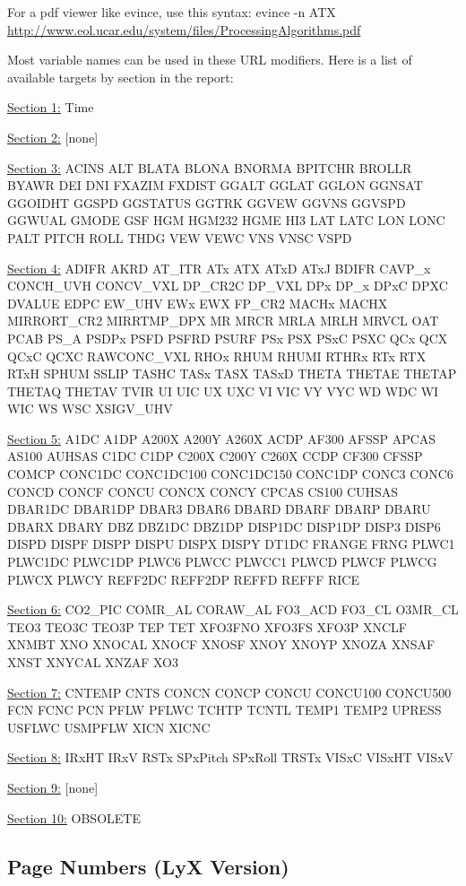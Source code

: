 \documentclass[
  english,
]{book}
\begin{document}
For a pdf viewer like evince, use this syntax: evince -n ATX
\url{http://www.eol.ucar.edu/system/files/ProcessingAlgorithms.pdf}

Most variable names can be used in these URL modifiers. Here is a list
of available targets by section in the report:

\underline{Section 1:} Time

\underline{Section 2:} {{[}none{]}}

\underline{Section 3:} ACINS ALT BLATA BLONA BNORMA BPITCHR BROLLR BYAWR
DEI DNI FXAZIM FXDIST GGALT GGLAT GGLON GGNSAT GGOIDHT GGSPD GGSTATUS
GGTRK GGVEW GGVNS GGVSPD GGWUAL GMODE GSF HGM HGM232 HGME HI3 LAT LATC
LON LONC PALT PITCH ROLL THDG VEW VEWC VNS VNSC VSPD

\underline{Section 4:} ADIFR AKRD AT\_ITR ATx ATX ATxD ATxJ BDIFR
CAVP\_x CONCH\_UVH CONCV\_VXL DP\_CR2C DP\_VXL DPx DP\_x DPxC DPXC
DVALUE EDPC EW\_UHV EWx EWX FP\_CR2 MACHx MACHX MIRRORT\_CR2
MIRRTMP\_DPX MR MRCR MRLA MRLH MRVCL OAT PCAB PS\_A PSDPx PSFD PSFRD
PSURF PSx PSX PSxC PSXC QCx QCX QCxC QCXC RAWCONC\_VXL RHOx RHUM RHUMI
RTHRx RTx RTX RTxH SPHUM SSLIP TASHC TASx TASX TASxD THETA THETAE THETAP
THETAQ THETAV TVIR UI UIC UX UXC VI VIC VY VYC WD WDC WI WIC WS WSC
XSIGV\_UHV

\underline{Section 5:} A1DC A1DP A200X A200Y A260X ACDP AF300 AFSSP
APCAS AS100 AUHSAS C1DC C1DP C200X C200Y C260X CCDP CF300 CFSSP COMCP
CONC1DC CONC1DC100 CONC1DC150 CONC1DP CONC3 CONC6 CONCD CONCF CONCU
CONCX CONCY CPCAS CS100 CUHSAS DBAR1DC DBAR1DP DBAR3 DBAR6 DBARD DBARF
DBARP DBARU DBARX DBARY DBZ DBZ1DC DBZ1DP DISP1DC DISP1DP DISP3 DISP6
DISPD DISPF DISPP DISPU DISPX DISPY DT1DC FRANGE FRNG PLWC1 PLWC1DC
PLWC1DP PLWC6 PLWCC PLWCC1 PLWCD PLWCF PLWCG PLWCX PLWCY REFF2DC REFF2DP
REFFD REFFF RICE

\underline{Section 6:} CO2\_PIC COMR\_AL CORAW\_AL FO3\_ACD FO3\_CL
O3MR\_CL TEO3 TEO3C TEO3P TEP TET XFO3FNO XFO3FS XFO3P XNCLF XNMBT XNO
XNOCAL XNOCF XNOSF XNOY XNOYP XNOZA XNSAF XNST XNYCAL XNZAF XO3

\underline{Section 7:} CNTEMP CNTS CONCN CONCP CONCU CONCU100 CONCU500
FCN FCNC PCN PFLW PFLWC TCHTP TCNTL TEMP1 TEMP2 UPRESS USFLWC USMPFLW
XICN XICNC

\underline{Section 8:} IRxHT IRxV RSTx SPxPitch SPxRoll TRSTx VISxC
VISxHT VISxV

\underline{Section 9:} {{[}none{]}}

\underline{Section 10:} OBSOLETE

\hypertarget{page-numbers-lyx-version}{%
\subsection*{Page Numbers (LyX
Version)}\label{page-numbers-lyx-version}}
\end{document}
